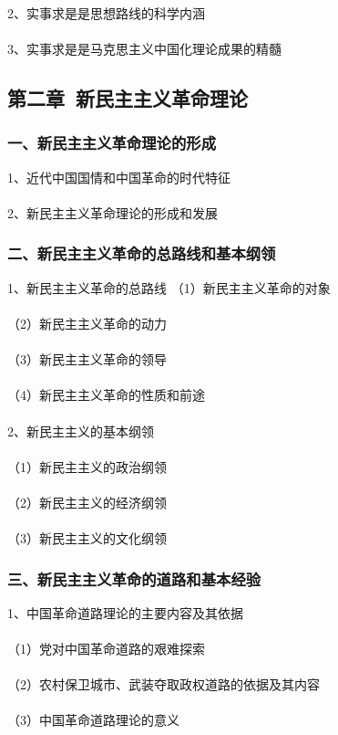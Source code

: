 \documentclass{ctexart}
\begin{document}
2、实事求是是思想路线的科学内涵
\\\\

3、实事求是是马克思主义中国化理论成果的精髓


\subsection{第二章\ 新民主主义革命理论}
\subsubsection{一、新民主主义革命理论的形成}
1、近代中国国情和中国革命的时代特征
\\\\

2、新民主主义革命理论的形成和发展


\subsubsection{二、新民主主义革命的总路线和基本纲领}
1、新民主主义革命的总路线
（1）新民主主义革命的对象
\\\\
（2）新民主主义革命的动力
\\\\
（3）新民主主义革命的领导
\\\\
（4）新民主主义革命的性质和前途
\\\\

2、新民主主义的基本纲领
\\\\
（1）新民主主义的政治纲领
\\\\
（2）新民主主义的经济纲领
\\\\
（3）新民主主义的文化纲领

\subsubsection{三、新民主主义革命的道路和基本经验}
1、中国革命道路理论的主要内容及其依据
\\\\
（1）党对中国革命道路的艰难探索
\\\\
（2）农村保卫城市、武装夺取政权道路的依据及其内容
\\\\
（3）中国革命道路理论的意义
\\\\
\end{document}
